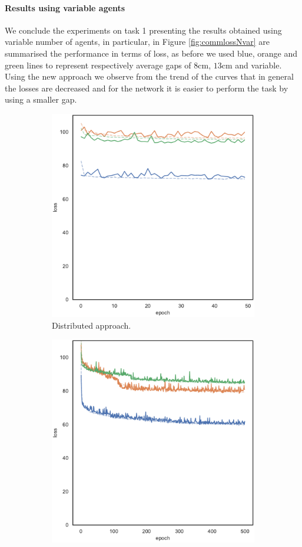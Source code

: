 \paragraph*{Results using variable agents}
We conclude the experiments on task 1 presenting the results obtained using 
variable number of agents, in particular, in Figure \ref{fig:commlossNvar} are 
summarised the performance in terms of loss, as before we used blue, orange and 
green lines to represent respectively average gaps of $8$\gls{cm}, $13$\gls{cm} 
and variable.
Using the new approach we observe from the trend of the curves that in general 
the losses are decreased and for the network it is easier to perform the task by 
using a smaller gap.
\begin{figure}[!htb]
	\begin{center}
		\begin{subfigure}[h]{0.49\textwidth}
			\centering
			\includegraphics[width=.7\textwidth]{contents/images/task1-comm-extension/loss-distributed-Nvar@copy}
			\caption{Distributed approach.}
		\end{subfigure}
		\hfill
		\begin{subfigure}[h]{0.49\textwidth}
			\centering
			\includegraphics[width=.7\textwidth]{contents/images/task1-comm-extension/loss-communication-Nvar@copy}

\end{subfigure}
\end{center}
\end{figure}
